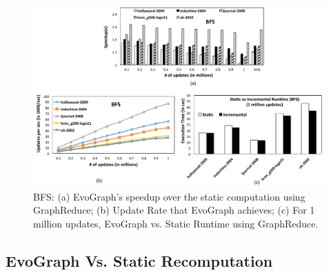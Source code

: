 \begin{figure}[!t]
\centering
\includegraphics [width=1\columnwidth]{figures/exp1.pdf}
\caption{BFS: (a) EvoGraph's speedup over the static computation using GraphReduce; (b) Update Rate that EvoGraph achieves; (c) For 1 million updates, EvoGraph vs. Static Runtime using GraphReduce. }
\label{fig:exp1}
\end{figure}



\subsection{EvoGraph Vs. Static Recomputation}


